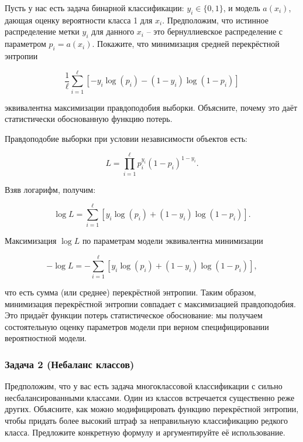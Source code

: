 Пусть у нас есть задача бинарной классификации: $y_i \in \{0,1\}$, и модель $a(x_i)$, дающая оценку вероятности класса 1 для $x_i$. Предположим, что истинное распределение метки $y_i$ для данного $x_i$ – это бернуллиевское распределение с параметром $p_i = a(x_i)$. Покажите, что минимизация средней перекрёстной энтропии

$$
\frac{1}{\ell}\sum_{i=1}^{\ell} \left[-y_i\log(p_i) - (1 - y_i)\log(1 - p_i)\right]
$$

эквивалентна максимизации правдоподобия выборки. Объясните, почему это даёт статистически обоснованную функцию потерь.

\begin{solution}
Правдоподобие выборки при условии независимости объектов есть:

$$
L = \prod_{i=1}^{\ell} p_i^{y_i}(1 - p_i)^{1 - y_i}.
$$

Взяв логарифм, получим:

$$
\log L = \sum_{i=1}^{\ell} [y_i\log(p_i) + (1 - y_i)\log(1 - p_i)].
$$

Максимизация $\log L$ по параметрам модели эквивалентна минимизации

$$
-\log L = -\sum_{i=1}^{\ell} [y_i\log(p_i) + (1 - y_i)\log(1 - p_i)],
$$

что есть сумма (или среднее) перекрёстной энтропии. Таким образом, минимизация перекрёстной энтропии совпадает с максимизацией правдоподобия. Это придаёт функции потерь статистическое обоснование: мы получаем состоятельную оценку параметров модели при верном специфицировании вероятностной модели.
\end{solution}

\subsubsection*{Задача 2 (Небаланс классов)}

Предположим, что у вас есть задача многоклассовой классификации с сильно несбалансированными классами. Один из классов встречается существенно реже других. Объясните, как можно модифицировать функцию перекрёстной энтропии, чтобы придать более высокий штраф за неправильную классификацию редкого класса. Предложите конкретную формулу и аргументируйте её использование.

